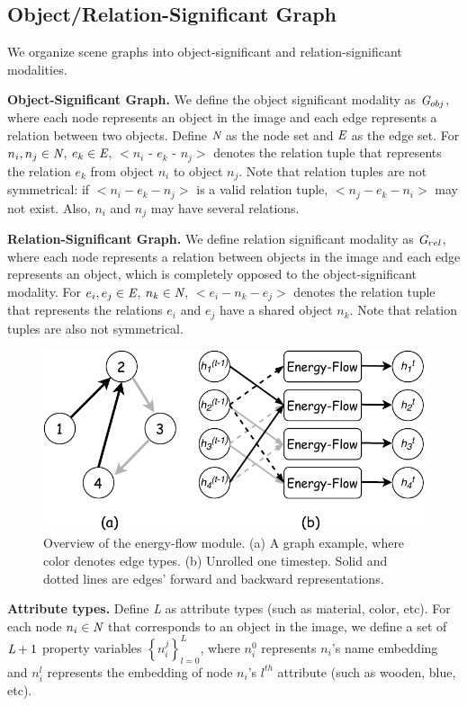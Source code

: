 \documentclass[letterpaper]{article} %
\begin{document}
\subsection{Object/Relation-Significant Graph}
We organize scene graphs into object-significant and relation-significant modalities. 

\medskip
\textbf{Object-Significant Graph.} We define the object significant modality as $\emph{G}_{obj}$, where each node represents an object in the image and each edge represents a relation between two objects. Define $\emph{N}$ as the node set and $\emph{E}$ as the edge set. For $n_i, n_j \in \emph{N}$, $e_k \in \emph{E}$, $<n_i$ - $e_k$ - $n_j>$ denotes the relation tuple that represents the relation $e_k$ from object $n_i$ to object $n_j$. Note that relation tuples are not symmetrical: if $<n_i - e_k - n_j>$ is a valid relation tuple,  $<n_j - e_k - n_i>$ may not exist. Also, $n_i$ and $n_j$ may have several relations. 

\medskip
\textbf{Relation-Significant Graph.} We define relation significant modality as $\emph{G}_{rel}$, where each node represents a relation between objects in the image and each edge represents an object, which is completely opposed to the object-significant modality. For $e_i, e_j \in \emph{E}$, $n_k \in \emph{N}$, $<e_i - n_k - e_j>$ denotes the relation tuple that represents the relations $e_i$ and $e_j$ have a shared object $n_k$. Note that relation tuples are also not symmetrical.

\begin{figure}[t] 
    \includegraphics[width=1\textwidth]{./pic/EF3.pdf} 
    \caption{Overview of the energy-flow module. (a) A graph example, where color denotes edge types. (b) Unrolled one timestep. Solid and dotted lines are edges' forward and backward representations.} 
    \label{EF} 
\end{figure}

\medskip
\textbf{Attribute types.} Define \emph{L} as attribute types (such as material, color, etc). 
For each node $n_i\in\emph{N}$ that corresponds to an object in the image, we define a set of $\emph{L}+1$ property variables ${\left\{ n_i^j\right\}}_{l=0}^L$, where $n_i^{0}$ represents $n_i$'s name embedding and $n_i^l$ represents the embedding of node $n_i$'s $l^{th}$ attribute (such as wooden, blue, etc).
\end{document}
